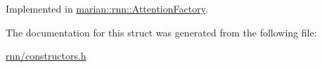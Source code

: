 Implemented in \hyperlink{classmarian_1_1rnn_1_1AttentionFactory_ad40def6ee2a38873a116fd80dd4916f1}{marian\+::rnn\+::\+Attention\+Factory}.



The documentation for this struct was generated from the following file\+:\begin{DoxyCompactItemize}
\item 
\hyperlink{rnn_2constructors_8h}{rnn/constructors.\+h}\end{DoxyCompactItemize}
